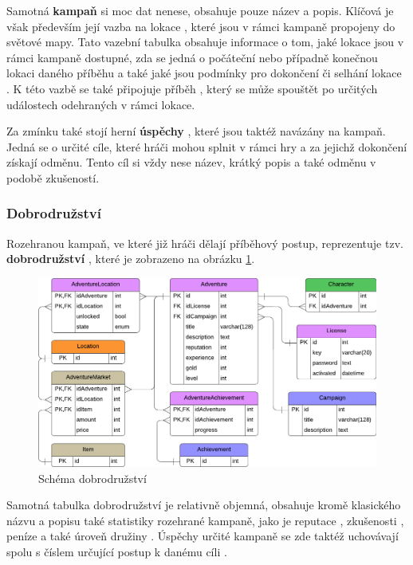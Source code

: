 Samotná \textbf{kampaň}  si moc dat nenese, obsahuje pouze název a popis. Klíčová je však především její vazba na lokace , které jsou v rámci kampaně propojeny do světové mapy. Tato vazební tabulka obsahuje informace o tom, jaké lokace jsou v rámci kampaně dostupné, zda se jedná o počáteční  nebo případně konečnou  lokaci daného příběhu a také jaké jsou podmínky pro dokončení či selhání lokace . K této vazbě se také připojuje příběh , který se může spouštět po určitých událostech odehraných v rámci lokace.

Za zmínku také stojí herní \textbf{úspěchy} , které jsou taktéž navázány na kampaň. Jedná se o určité cíle, které hráči mohou splnit v rámci hry a za jejichž dokončení získají odměnu. Tento cíl si vždy nese název, krátký popis a také odměnu v podobě zkušeností.


\subsubsection*{Dobrodružství}
\label{subsubsec:schema_adventure}

Rozehranou kampaň, ve které již hráči dělají příběhový postup, reprezentuje tzv. \textbf{dobrodružství} , které je zobrazeno na obrázku \ref{diag:er_adventure}.

\begin{figure}[h]
    \centering
    \includegraphics[scale=0.8]{../../shared/diagrams/er_adventure.pdf}
    \caption{Schéma dobrodružství}
    \label{diag:er_adventure}
\end{figure}

Samotná tabulka dobrodružství je relativně objemná, obsahuje kromě klasického názvu a popisu také statistiky rozehrané kampaně, jako je reputace , zkušenosti , peníze  a také úroveň družiny . Úspěchy určité kampaně  se zde taktéž uchovávají spolu s číslem určující postup k danému cíli .

